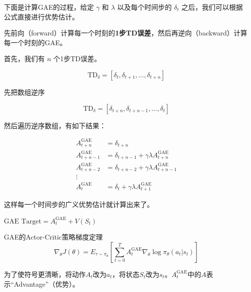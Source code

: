 \documentclass[lang=cn,newtx,10pt,scheme=chinese]{elegantbook}
\begin{document}
下面是计算GAE的过程，给定 $\gamma$ 和 $\lambda$ 以及每个时间步的 $\delta_t$ 之后，我们可以根据公式直接进行优势估计。

先前向（forward）计算每一个时刻的\textbf{1步TD误差}，然后再逆向（backward）计算每一个时刻的GAE。

首先，我们有 $n$ 个1步TD误差。

\begin{equation}
\text{TD}_\delta = \left[\delta_t, \delta_{t+1}, \dots, \delta_{t+n}\right]
\end{equation}

先把数组逆序

\begin{equation}
\text{TD}_\delta = \left[\delta_{t+n}, \delta_{t+n-1}, \dots, \delta_{t}\right]
\end{equation}

然后遍历逆序数组，有如下结果：

\begin{equation}
\begin{aligned}
A_{t+n}^{\text{GAE}} &= \delta_{t+n} \\
A_{t+n-1}^{\text{GAE}} &= \delta_{t+n-1} + \gamma\lambda A_{t+n}^{\text{GAE}} \\
A_{t+n-2}^{\text{GAE}} &= \delta_{t+n-2} + \gamma\lambda A_{t+n-1}^{\text{GAE}} \\
\vdots \\
A_t^{\text{GAE}} &= \delta_t + \gamma\lambda A_{t+1}^{\text{GAE}}
\end{aligned}
\end{equation}

这样每一个时间步的广义优势估计就计算出来了。

\begin{marker}
$\text{GAE Target} = A_t^{\text{GAE}} + V(S_t)$
\end{marker}

\begin{theorem}{GAE的Actor-Critic策略梯度定理}{}
\begin{equation}\label{eq:gae-pg}
\nabla_{\theta}J(\theta)=E_{\tau\sim\pi_{\theta}}[\sum_{t=0}^TA^{\text{GAE}}_t\nabla_{\theta}\log\pi_{\theta}(a_t|s_t)]
\end{equation}
\end{theorem}

\begin{marker}
为了使符号更清晰，将动作$A_t$改为$a_t$，将状态$S_t$改为$s_t$。$A^{\text{GAE}}_t$中的$A$表示``Advantage''（优势）。
\end{marker}
\end{document}
